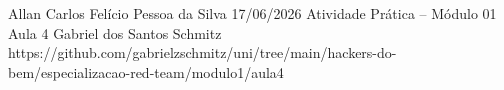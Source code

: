 \documentclass{article}
\begin{document}
{Allan Carlos Felício Pessoa da Silva}
{17/06/2026}
{Atividade Prática -- Módulo 01}
{Aula 4}
{Gabriel dos Santos Schmitz}
{https://github.com/gabrielzschmitz/uni/tree/main/hackers-do-bem/especializacao-red-team/modulo1/aula4}





\newpage
\printbibliography[title=Referências]
\end{document}
